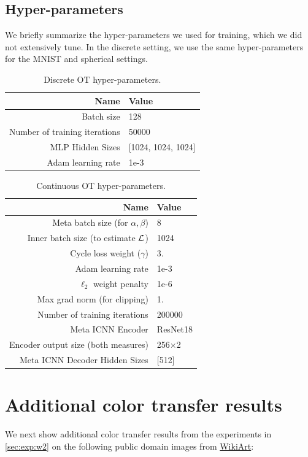 \documentclass{article}
\begin{document}
\subsection{Hyper-parameters}
We briefly summarize the hyper-parameters we used for training,
which we did not extensively tune.
In the discrete setting, we use the same hyper-parameters for the
MNIST and spherical settings.
\begin{table}[h]
  \caption{Discrete OT hyper-parameters.}
  \centering
  \begin{tabular}{rl}\toprule
    Name & Value \\\midrule
    Batch size & 128 \\
    Number of training iterations & 50000 \\
    MLP Hidden Sizes & [1024, 1024, 1024] \\
    Adam learning rate & 1e-3 \\\bottomrule
  \end{tabular}
\end{table}

\begin{table}[h]
  \caption{Continuous OT hyper-parameters.}
  \centering
  \begin{tabular}{rl}\toprule
    Name & Value \\\midrule
    Meta batch size (for $\alpha,\beta$) & 8 \\
    Inner batch size (to estimate ${\mathcal{L}}$) & 1024 \\
    Cycle loss weight ($\gamma$) & 3. \\

    Adam learning rate & 1e-3 \\
    $\ell_2$ weight penalty & 1e-6 \\
    Max grad norm (for clipping) & 1. \\

    Number of training iterations & 200000 \\
    Meta ICNN Encoder & ResNet18 \\
    Encoder output size (both measures) & 256$\times$2 \\
    Meta ICNN Decoder Hidden Sizes & [512] \\\bottomrule
  \end{tabular}
\end{table}

\newpage
\section{Additional color transfer results}
\label{app:color}
We next show additional color transfer results
from the experiments in \cref{sec:exp:w2}
on the following public domain images from
\href{https://www.wikiart.org/}{WikiArt}:
\end{document}
